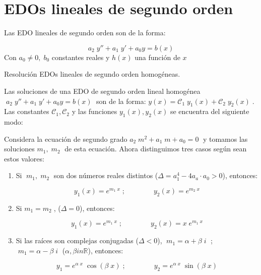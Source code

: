 \section{EDOs lineales de segundo orden}

\begin{defi}
Las EDO lineales de segundo orden son de la forma:

\begin{equation*}
  \boxed{ \; a_2\; y'' + a_1	\; y' + a_0 y= b(x) \; }
\end{equation*}
	Con $a_0\neq 0, \; b_0$ constantes reales y $h(x)$ una función de $x$
\end{defi}

\begin{teor}{Resolución EDOs lineales de segundo orden homogéneas.}

Las soluciones de una EDO de segundo orden lineal homogénea $\; a_2\; y'' + a_1	\; y' + a_0 y= b(x) \;$ son de la forma: $y(x)=\mathcal{C}_1\; y_1(x)+\mathcal{C}_2\; y_2(x)\;$. Las constantes $\mathcal{C}_1, \mathcal{C}_2$ y las funciones $y_1(x), y_2(x)$ se encuentra del siguiente modo:

Considera la ecuación de segundo grado \; $a_2\;  m^2 + a_1 \; m + a_0=0\; $ y tomamos las soluciones \; $m_1,\;  m_2\; $ de esta ecuación. Ahora distinguimos tres casos según sean estos valores:

\begin{enumerate}

\item  Si $\; m_1,\; m_2\; $	son dos números reales distintos ($\Delta=a_1^4-4a_a\cdot a_0>0$), entonces:

\begin{equation*}
	y_1(x)=e^{m_1\; x} \; ;  \qquad  \qquad y_2(x)=e^{m_2\; x}
\end{equation*}

\item Si $m_1=m_2\; $,  ($\Delta=0$), entonces:

\begin{equation*}
	y_1(x)=e^{m_1\; x} \; ;  \qquad  \qquad y_2(x)=x\; e^{m_1\; x}
\end{equation*}

\item Si las raíces son complejas conjugadas ($\Delta<0$), 
$\; m_1=\alpha + \beta \; i\; $ ; $\; m_1=\alpha - \beta \; i\; $ ($\alpha, \beta in \mathbb R$), entonces:

\begin{equation*}
	y_1=e^{\alpha\; x}\; \cos (\beta\; x) \; ;  \qquad  \qquad y_2=e^{\alpha\; x}\; \sin (\beta\; x)
\end{equation*}
\end{enumerate}
\end{teor}

